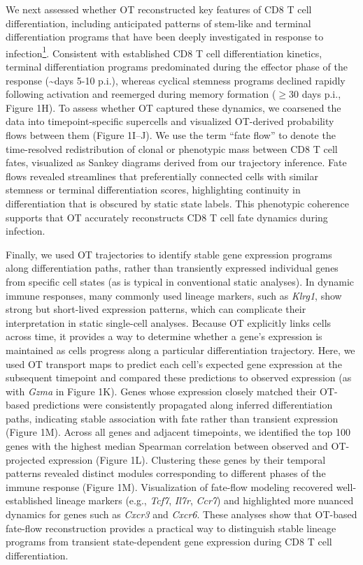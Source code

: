 We next assessed whether OT reconstructed key features of CD8 T cell
differentiation, including anticipated patterns of stem-like and
terminal differentiation programs that have been deeply investigated in
response to
infection\href{https://sciwheel.com/work/citation?ids=1306567\&pre=\&suf=\&sa=0\&dbf=0}{\textsuperscript{1}}.
Consistent with established CD8 T cell differentiation kinetics,
terminal differentiation programs predominated during the effector phase
of the response (\textasciitilde{}days 5-10 p.i.), whereas cyclical
stemness programs declined rapidly following activation and reemerged
during memory formation ($\geq$30 days p.i., Figure 1H). To assess whether OT
captured these dynamics, we coarsened the data into timepoint-specific
supercells and visualized OT-derived probability flows between them
(Figure 1I--J). We use the term ``fate flow'' to denote the
time-resolved redistribution of clonal or phenotypic mass between CD8 T
cell fates, visualized as Sankey diagrams derived from our trajectory
inference. Fate flows revealed streamlines that preferentially connected
cells with similar stemness or terminal differentiation scores,
highlighting continuity in differentiation that is obscured by static
state labels. This phenotypic coherence supports that OT accurately
reconstructs CD8 T cell fate dynamics during infection.

Finally, we used OT trajectories to identify stable gene expression
programs along differentiation paths, rather than transiently expressed
individual genes from specific cell states (as is typical in
conventional static analyses). In dynamic immune responses, many
commonly used lineage markers, such as \emph{Klrg1}, show strong but
short-lived expression patterns, which can complicate their
interpretation in static single-cell analyses. Because OT explicitly
links cells across time, it provides a way to determine whether a gene's
expression is maintained as cells progress along a particular
differentiation trajectory. Here, we used OT transport maps to predict
each cell's expected gene expression at the subsequent timepoint and
compared these predictions to observed expression (as with \emph{Gzma}
in Figure 1K). Genes whose expression closely matched their OT-based
predictions were consistently propagated along inferred differentiation
paths, indicating stable association with fate rather than transient
expression (Figure 1M). Across all genes and adjacent timepoints, we
identified the top 100 genes with the highest median Spearman
correlation between observed and OT-projected expression (Figure 1L).
Clustering these genes by their temporal patterns revealed distinct
modules corresponding to different phases of the immune response (Figure
1M). Visualization of fate-flow modeling recovered well-established
lineage markers (e.g., \emph{Tcf7}, \emph{Il7r}, \emph{Ccr7}) and
highlighted more nuanced dynamics for genes such as \emph{Cxcr3} and
\emph{Cxcr6}. These analyses show that OT-based fate-flow reconstruction
provides a practical way to distinguish stable lineage programs from
transient state-dependent gene expression during CD8 T cell
differentiation.

